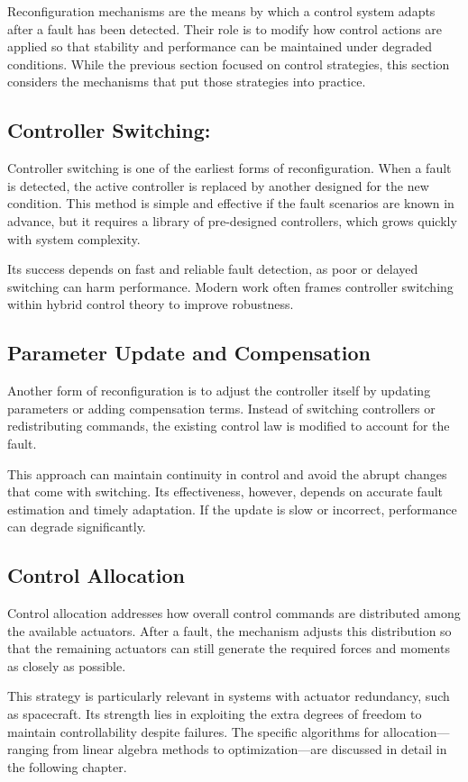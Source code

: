 Reconfiguration mechanisms are the means by which a control system adapts after a fault has been detected. Their role is to modify how control actions are applied so that stability and performance can be maintained under degraded conditions. While the previous section focused on control strategies, this section considers the mechanisms that put those strategies into practice.

\subsection{Controller Switching:} 
Controller switching is one of the earliest forms of reconfiguration. When a fault is detected, the active controller is replaced by another designed for the new condition. This method is simple and effective if the fault scenarios are known in advance, but it requires a library of pre-designed controllers, which grows quickly with system complexity.

Its success depends on fast and reliable fault detection, as poor or delayed switching can harm performance. Modern work often frames controller switching within hybrid control theory to improve robustness.

\subsection{Parameter Update and Compensation}
Another form of reconfiguration is to adjust the controller itself by updating parameters or adding compensation terms. Instead of switching controllers or redistributing commands, the existing control law is modified to account for the fault.

This approach can maintain continuity in control and avoid the abrupt changes that come with switching. Its effectiveness, however, depends on accurate fault estimation and timely adaptation. If the update is slow or incorrect, performance can degrade significantly.

\subsection{Control Allocation} 
Control allocation addresses how overall control commands are distributed among the available actuators. After a fault, the mechanism adjusts this distribution so that the remaining actuators can still generate the required forces and moments as closely as possible.

This strategy is particularly relevant in systems with actuator redundancy, such as spacecraft. Its strength lies in exploiting the extra degrees of freedom to maintain controllability despite failures. The specific algorithms for allocation—ranging from linear algebra methods to optimization—are discussed in detail in the following chapter.

